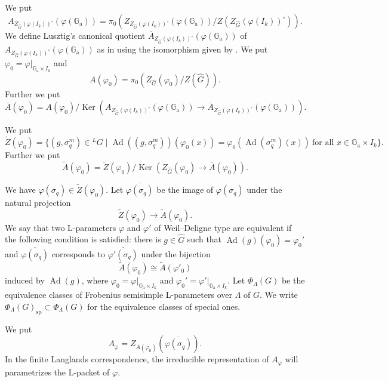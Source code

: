 \documentclass[12pt,a4paper]{article}
\DeclareMathOperator{\Ker}{Ker}
\DeclareMathOperator{\Ad}{Ad}
\newcommand{\mr}{\mathrm}
\newcommand{\ol}{\overline}
\newcommand{\wh}{\widehat}
\newcommand{\Ga}{\mathbb{G}_{\mathrm{a}}}
\begin{document}
We put
\[
 A_{Z_{\wh{G}}(\varphi(I_k))^{\circ}}(\varphi(\Ga)) =
 \pi_0 (Z_{Z_{\wh{G}}(\varphi(I_k))^{\circ}}(\varphi(\Ga))/Z(Z_{\wh{G}}(\varphi(I_k))^{\circ})). 
\]
We define Lusztig's canonical quotient $\ol{A}_{Z_{\wh{G}}(\varphi(I_k))^{\circ}}(\varphi(\Ga))$
	of $A_{Z_{\wh{G}}(\varphi(I_k))^{\circ}}(\varphi(\Ga))$ as in \cite[13.1]{LusChred} using the isomorphism given by \cite[Lemma 4.2]{IVLpfin}. 
We put $\varphi_0=\varphi|_{\Ga \times I_k}$ and
\begin{equation}
	A(\varphi_0)=\pi_0 \left( Z_{\wh{G}}(\varphi_0)/Z(\wh{G}) \right).
\end{equation}
 Further we put
\begin{equation}
	\ol{A}(\varphi_0)=A(\varphi_0)/\Ker ( A_{Z_{\wh{G}}(\varphi(I_k))^{\circ}}(\varphi(\Ga)) \to \ol{A}_{Z_{\wh{G}}(\varphi(I_k))^{\circ}}(\varphi(\Ga))).
\end{equation}

We put
\begin{equation*}
	\widetilde{Z}(\varphi_0)=\{ (g,\sigma_q^m) \in {}^{L}G \mid
	\Ad ((g,\sigma_q^m))(\varphi_0 (x))=\varphi_0 (\Ad (\sigma_q^m)(x)) \ \textrm{for all $x \in \Ga \times I_k$}
	\}.
\end{equation*}
Further we put
\begin{equation}
	\widetilde{A}(\varphi_0)=\widetilde{Z}(\varphi_0) /
	\Ker (Z_{\wh{G}}(\varphi_0) \to \ol{A}(\varphi_0)).
\end{equation}

We have 
$\varphi (\sigma_q) \in \widetilde{Z}(\varphi_0)$. 
Let $\ol{\varphi (\sigma_q)}$ be the image of 
$\varphi (\sigma_q)$ under the natural projection 
\[
\widetilde{Z}(\varphi_0) \to 
\widetilde{A}(\varphi_0). 
\]
We say that two 
L-parameters $\varphi$ and $\varphi'$ of Weil--Deligne type are equivalent 
if the following condition is satisfied: 
there is $g \in \wh{G}$ such that 
$\Ad (g)(\varphi_0)=\varphi_0'$ and 
$\ol{\varphi (\sigma_q)}$ corresponds to 
$\ol{\varphi' (\sigma_q)}$ under the bijection 
\[
\widetilde{A}(\varphi_0) \cong 
\widetilde{A}(\varphi'_0) 
\]
induced by $\Ad (g)$, where 
$\varphi_0=\varphi|_{\Ga \times I_k}$ and 
$\varphi_0'=\varphi'|_{\Ga \times I_k}$. 
Let $\Phi_{\Lambda}(G)$ be the equivalence classes of 
Frobenius semisimple L-parameters over $\Lambda$ of $G$. 
We write $\Phi_{\Lambda}(G)_{\mr{sp}} \subset \Phi_{\Lambda}(G)$ for 
the equivalence classes of special ones. 

We put
\begin{equation}
	A_{\varphi} = Z_{\ol{A}(\varphi_0)} (\ol{\varphi (\sigma_q)}) . 
\end{equation} 
In the finite Langlands correspondence, the irreducible representation of 
$A_{\varphi}$ will parametrizes the L-packet of $\varphi$. 
\end{document}
